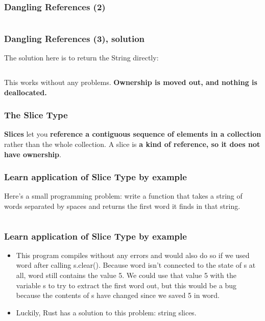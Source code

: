 \documentclass{beamer}
\begin{document}
\begin{frame}[fragile]
	\frametitle{Dangling References (2)}
	
	\inputminted{shell}{./code/dangling.shell}
\end{frame}

\begin{frame}[fragile]
	\frametitle{Dangling References (3), solution}
	The solution here is to return the String directly:
	
	\inputminted{rust}{./code/dangling-sol.rs}
	
	This works without any problems. \textbf{Ownership is moved out, and nothing is deallocated.}
\end{frame}


\begin{frame}[fragile]
	\frametitle{The Slice Type}
	\textbf{Slices} let you \textbf{reference a contiguous sequence of elements in a collection} rather than the whole collection. A slice is \textbf{a kind of reference, so it does not have ownership}.
\end{frame}

\begin{frame}[fragile]
	\frametitle{Learn application of Slice Type by example}
	Here’s a small programming problem: write a function that takes a string of words separated by spaces and returns the first word it finds in that string.
	\scriptsize
	\inputminted[fontsize=\scriptsize]{rust}{./code/slice.rs}
\end{frame}

\begin{frame}[fragile]
	\frametitle{Learn application of Slice Type by example}
	\begin{itemize}
		\item This program compiles without any errors and would also do so if we used word after calling s.clear(). Because word isn’t connected to the state of s at all, word still contains the value 5. We could use that value 5 with the variable s to try to extract the first word out, but this would be a bug because the contents of s have changed since we saved 5 in word.
		\item Luckily, Rust has a solution to this problem: string slices.
	\end{itemize}
\end{frame}
\end{document}
